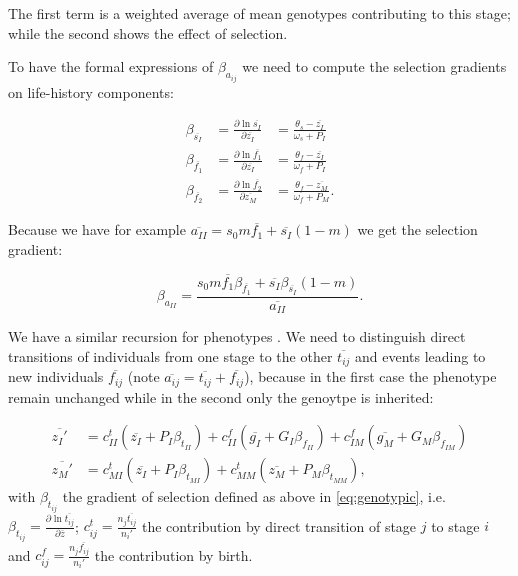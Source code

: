 The first term is a weighted average of mean genotypes contributing to this stage; while the second shows the effect of selection.

To have the formal expressions of $\beta_{a_{ij}}$ we need to compute the selection gradients on life-history components:

\begin{equation}
	\label{eq:selgradlfh}
	\begin{aligned}
	\beta_{\overline{s_I}} &= \frac{\partial \ln \overline{s_I}}{\partial \overline{z_I}} &= \frac{\theta_s - \overline{z_I}}{\omega_s + P_I} \\
	\beta_{\overline{f_1}} &= \frac{\partial \ln \overline{f_1}}{\partial \overline{z_I}} &= \frac{\theta_f - \overline{z_I}}{\omega_f + P_I} \\
	\beta_{\overline{f_2}} &= \frac{\partial \ln \overline{f_2}}{\partial \overline{z_M}} &= \frac{\theta_f - \overline{z_M}}{\omega_f + P_M}.
	\end{aligned}
\end{equation}

Because we have for example $\overline{a_{II}} = s_0 m \overline{f_1} + \overline{s_I} (1-m)$ we get the selection gradient:

\begin{equation}
	\label{eq:selgradaII}
	\beta_{a_{II}} = \frac{s_0 m \overline{f_1} \beta_{\overline{f_1}} + \overline{s_I} \beta_{\overline{s_I}} (1-m)}{\overline{a_{II}}}.
\end{equation}

We have a similar recursion for phenotypes \citep{barfield_evolution_2011}. We need to distinguish direct transitions of individuals from one stage to the other $\overline{t_{ij}}$ and events leading to new individuals $\overline{f_{ij}}$ (note $\overline{a_{ij}} = \overline{t_{ij}} + \overline{f_{ij}}$), because in the first case the phenotype remain unchanged while in the second only the genoytpe is inherited:

\begin{subequations}
	\begin{align}
	\label{eq:phenotypic}
	\overline{z_I'} &= c_{II}^t (\overline{z_I} + P_I \beta_{t_{II}}) + c_{II}^f (\overline{g_I} + G_I \beta_{f_{II}}) + c_{IM}^f (\overline{g_M} + G_M \beta_{f_{IM}}) \\
	\overline{z_M'} &= c_{MI}^t (\overline{z_I} + P_I \beta_{t_{MI}}) + c_{MM}^t (\overline{z_M} + P_M \beta_{t_{MM}}),
	\end{align}
\end{subequations}
with $\beta_{t_{ij}}$ the gradient of selection defined as above in \autoref{eq:genotypic}, i.e. $\beta_{t_{ij}} = \frac{\partial \ln \overline{t_{ij}}}{\partial \overline{z}}$; $c_{ij}^t = \frac{n_j \overline{t_{ij}}}{n_i'}$ the contribution by direct transition of stage $j$ to stage $i$ and $c_{ij}^f = \frac{n_j \overline{f_{ij}}}{n_i'}$ the contribution by birth.

